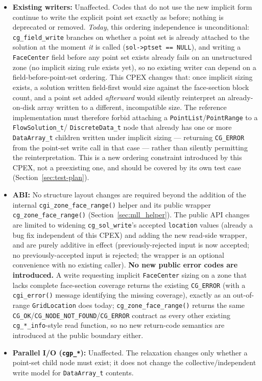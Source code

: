 \documentclass[11pt,letterpaper]{article}
\begin{document}
\begin{itemize}[leftmargin=2em]
\item \textbf{Existing writers:} Unaffected. Codes that do not use the
  new implicit form continue to write the explicit point set exactly as
  before; nothing is deprecated or removed. \emph{Today}, this ordering
  independence is unconditional: \texttt{cg\_field\_write} branches on
  whether a point set is already attached to the solution at the moment
  \emph{it} is called (\texttt{sol->ptset == NULL}), and writing a
  \texttt{FaceCenter} field before any point set exists already fails on
  an unstructured zone (no implicit sizing rule exists yet), so no
  existing writer can depend on a field-before-point-set ordering. This
  CPEX changes that: once implicit sizing exists, a solution written
  field-first would size against the face-section block count, and a point set
  added \emph{afterward} would silently reinterpret an
  already-on-disk array written to a different, incompatible size. The
  reference implementation must therefore forbid attaching a
  \texttt{PointList}/\texttt{PointRange} to a \texttt{FlowSolution\_t}/
  \texttt{DiscreteData\_t} node that already has one or more
  \texttt{DataArray\_t} children written under implicit sizing --- returning
  \texttt{CG\_ERROR} from the point-set write call in that case --- rather
  than silently permitting the reinterpretation. This is a new ordering
  constraint introduced by this CPEX, not a preexisting one, and should be
  covered by its own test case (Section~\ref{sec:test-plan}).

\item \textbf{ABI:} No structure layout changes are required beyond the
  addition of the internal \texttt{cgi\_zone\_face\_range()} helper
  and its public wrapper \texttt{cg\_zone\_face\_range()}
  (Section~\ref{sec:mll_helper}). The public API changes are limited to
  widening \texttt{cg\_sol\_write}'s accepted \texttt{location} values
  (already a bug fix independent of this CPEX) and adding the new
  read-side wrapper, and are purely additive in effect
  (previously-rejected input is now accepted; no previously-accepted
  input is rejected; the wrapper is an optional convenience with no
  existing caller). \textbf{No new public error codes are introduced.}
  A write requesting implicit \texttt{FaceCenter} sizing on a zone that
  lacks complete face-section coverage returns the existing
  \texttt{CG\_ERROR} (with a \texttt{cgi\_error()} message identifying
  the missing coverage), exactly as an out-of-range \texttt{GridLocation}
  does today; \texttt{cg\_zone\_face\_range()} returns the same
  \texttt{CG\_OK}/\texttt{CG\_NODE\_NOT\_FOUND}/\texttt{CG\_ERROR}
  contract as every other existing \texttt{cg\_*\_info}-style read
  function, so no new return-code semantics are introduced at the public
  boundary either.

\item \textbf{Parallel I/O (\texttt{cgp\_*}):} Unaffected. The relaxation
  changes only whether a point-set child node must exist; it does not
  change the collective/independent write model for
  \texttt{DataArray\_t} contents.
\end{itemize}
\end{document}

